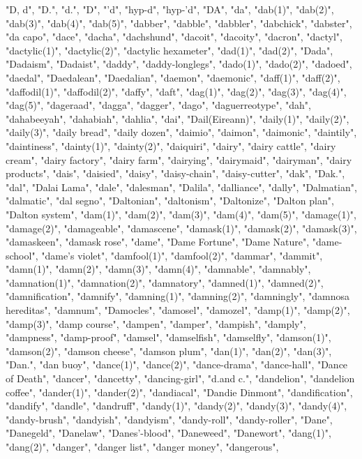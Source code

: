 "D, d",
"D.",
"d.",
"D",
"'d",
"hyp-d",
"hyp-'d",
"DA",
"da",
"dab(1)",
"dab(2)",
"dab(3)",
"dab(4)",
"dab(5)",
"dabber",
"dabble",
"dabbler",
"dabchick",
"dabster",
"da capo",
"dace",
"dacha",
"dachshund",
"dacoit",
"dacoity",
"dacron",
"dactyl",
"dactylic(1)",
"dactylic(2)",
"dactylic hexameter",
"dad(1)",
"dad(2)",
"Dada",
"Dadaism",
"Dadaist",
"daddy",
"daddy-longlegs",
"dado(1)",
"dado(2)",
"dadoed",
"daedal",
"Daedalean",
"Daedalian",
"daemon",
"daemonic",
"daff(1)",
"daff(2)",
"daffodil(1)",
"daffodil(2)",
"daffy",
"daft",
"dag(1)",
"dag(2)",
"dag(3)",
"dag(4)",
"dag(5)",
"dageraad",
"dagga",
"dagger",
"dago",
"daguerreotype",
"dah",
"dahabeeyah",
"dahabiah",
"dahlia",
"dai",
"Dail(Eireann)",
"daily(1)",
"daily(2)",
"daily(3)",
"daily bread",
"daily dozen",
"daimio",
"daimon",
"daimonic",
"daintily",
"daintiness",
"dainty(1)",
"dainty(2)",
"daiquiri",
"dairy",
"dairy cattle",
"dairy cream",
"dairy factory",
"dairy farm",
"dairying",
"dairymaid",
"dairyman",
"dairy products",
"dais",
"daisied",
"daisy",
"daisy-chain",
"daisy-cutter",
"dak",
"Dak.",
"dal",
"Dalai Lama",
"dale",
"dalesman",
"Dalila",
"dalliance",
"dally",
"Dalmatian",
"dalmatic",
"dal segno",
"Daltonian",
"daltonism",
"Daltonize",
"Dalton plan",
"Dalton system",
"dam(1)",
"dam(2)",
"dam(3)",
"dam(4)",
"dam(5)",
"damage(1)",
"damage(2)",
"damageable",
"damascene",
"damask(1)",
"damask(2)",
"damask(3)",
"damaskeen",
"damask rose",
"dame",
"Dame Fortune",
"Dame Nature",
"dame-school",
"dame's violet",
"damfool(1)",
"damfool(2)",
"dammar",
"dammit",
"damn(1)",
"damn(2)",
"damn(3)",
"damn(4)",
"damnable",
"damnably",
"damnation(1)",
"damnation(2)",
"damnatory",
"damned(1)",
"damned(2)",
"damnification",
"damnify",
"damning(1)",
"damning(2)",
"damningly",
"damnosa hereditas",
"damnum",
"Damocles",
"damosel",
"damozel",
"damp(1)",
"damp(2)",
"damp(3)",
"damp course",
"dampen",
"damper",
"dampish",
"damply",
"dampness",
"damp-proof",
"damsel",
"damselfish",
"damselfly",
"damson(1)",
"damson(2)",
"damson cheese",
"damson plum",
"dan(1)",
"dan(2)",
"dan(3)",
"Dan.",
"dan buoy",
"dance(1)",
"dance(2)",
"dance-drama",
"dance-hall",
"Dance of Death",
"dancer",
"dancetty",
"dancing-girl",
"d.and c.",
"dandelion",
"dandelion coffee",
"dander(1)",
"dander(2)",
"dandiacal",
"Dandie Dinmont",
"dandification",
"dandify",
"dandle",
"dandruff",
"dandy(1)",
"dandy(2)",
"dandy(3)",
"dandy(4)",
"dandy-brush",
"dandyish",
"dandyism",
"dandy-roll",
"dandy-roller",
"Dane",
"Danegeld",
"Danelaw",
"Danes'-blood",
"Daneweed",
"Danewort",
"dang(1)",
"dang(2)",
"danger",
"danger list",
"danger money",
"dangerous",
